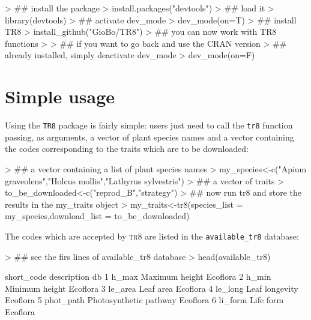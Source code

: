 \documentclass{article}
\begin{document}
\begin{Schunk}
\begin{Sinput}
> ## install the package
> install.packages("devtools")
> ## load it
> library(devtools)
> ## activate dev_mode
> dev_mode(on=T)
> ## install TR8
> install_github("GioBo/TR8")
> ## you can now work with TR8 functions
> 
> ## if you want to go back and use the CRAN version
> ## already installed, simply deactivate dev_mode
> dev_mode(on=F)
\end{Sinput}
\end{Schunk}
  
 
\section{Simple usage}
\label{sec:usage}

  Using the \texttt{TR8} package is fairly simple: users just need to
  call the \texttt{tr8} function passing, as arguments, a vector of
  plant species names and a vector containing the codes corresponding
  to the traits which are to be downloaded:
  
\begin{Schunk}
\begin{Sinput}
> ## a vector containing a list of plant species names
> my_species<-c("Apium graveolens","Holcus mollis","Lathyrus sylvestris")
> ## a vector of traits
> to_be_downloaded<-c("reprod_B","strategy")
> ## now run tr8 and store the results in the my_traits object
> my_traits<-tr8(species_list = my_species,download_list = to_be_downloaded)
\end{Sinput}
\end{Schunk}

  The codes which are accepted by \textsc{tr8} are listed in the \texttt{available\_tr8} database:

\begin{Schunk}
\begin{Sinput}
> ## see the firs lines of available_tr8 database
> head(available_tr8)
\end{Sinput}
\begin{Soutput}
  short_code            description       db
1      h_max         Maximum height Ecoflora
2      h_min         Minimum height Ecoflora
3    le_area              Leaf area Ecoflora
4    le_long         Leaf longevity Ecoflora
5  phot_path Photosynthetic pathway Ecoflora
6    li_form              Life form Ecoflora
\end{Soutput}
\end{Schunk}
\end{document}

